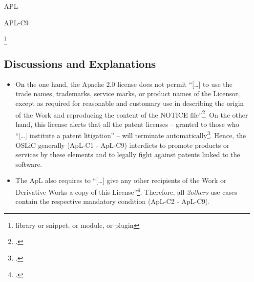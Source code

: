 \begin{license}{APL}
\begin{lsuc}{APL-C9}
\begin{lsucrequires}
    \lsucmandatory{\displayNoticeOfEmbeddedLibrary}
     
    \footnote{library or snippet, or module, or plugin} 

    \lsucoptional{\documentationBinary}
  
  \end{lsucrequires}

  \begin{lsucprohibits}
    \lsucitem{\noTrademarks}
    \lsucitem{\noPatentLitigation}
  \end{lsucprohibits}
\end{lsuc}

\subsection{Discussions and Explanations}
\label{APLDiscussion}
\begin{itemize}
  \item On the one hand, the Apache 2.0 license does not permit
  \enquote{[\ldots] to use the trade names, trademarks, service marks, or
  product names of the Licensor, except as required for reasonable and customary
  use in describing the origin of the Work and reproducing the content of the
  NOTICE file}\footcite[cf.][\nopage wp.\ §6]{Apl20OsiLicense2004a}. On the other
  hand, this license alerts that all the patent licenses – granted to those who
  \enquote{[\ldots] institute a patent litigation} – will terminate
  automatically\footcite[cf.][\nopage wp.\ §3]{Apl20OsiLicense2004a}. Hence, the
  OSLiC generally (ApL-C1 - ApL-C9) interdicts to promote products or services by
  these elements and to legally fight against patents linked to the software.
  
  \item The ApL also requires to \enquote{[\ldots] give any other recipients of
  the Work or Derivative Works a copy of this License}\footcite[cf.][\nopage wp.\
  §4.1]{Apl20OsiLicense2004a}. Therefore, all \emph{2others} use cases contain
  the respective mandatory condition (ApL-C2 - ApL-C9).
   

\end{itemize}
\end{license}
